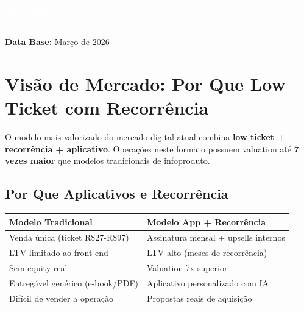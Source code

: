 \documentclass[12pt, a4paper]{article}
\begin{document}
\begin{titlepage}
    \colorbox{accentColor}{%
        \parbox{0.9\textwidth}{%
            \centering
            \vspace{0.6cm}
            \textcolor{white}{\Large \textbf{REFERÊNCIA: VICTOR XISTO}} \\
            \vspace{0.2cm}
            \textcolor{white}{\normalsize Operação Low Ticket | 140K+ alunos | Escala 100K+/dia} \\
            \vspace{0.6cm}
        }%
    }

    \vspace{0.2cm}
    \textbf{Data Base:} Março de 2026
\end{titlepage}

\section{Visão de Mercado: Por Que Low Ticket com Recorrência}

O modelo mais valorizado do mercado digital atual combina \textbf{low ticket + recorrência + aplicativo}. Operações neste formato possuem valuation até \textbf{7 vezes maior} que modelos tradicionais de infoproduto.

\subsection{Por Que Aplicativos e Recorrência}

\begin{table}[H]
    \centering
    \renewcommand{\arraystretch}{1.4}
    \begin{tabularx}{\textwidth}{X X}
        \toprule
        \rowcolor{tableHeader} \textbf{Modelo Tradicional} & \textbf{Modelo App + Recorrência} \\
        \midrule
        Venda única (ticket R\$27-R\$97) & Assinatura mensal + upsells internos \\
        \rowcolor{lightGray}
        LTV limitado ao front-end & LTV alto (meses de recorrência) \\
        Sem equity real & Valuation 7x superior \\
        \rowcolor{lightGray}
        Entregável genérico (e-book/PDF) & Aplicativo personalizado com IA \\
        Difícil de vender a operação & Propostas reais de aquisição \\
        \bottomrule
    \end{tabularx}
\end{table}
\end{document}
